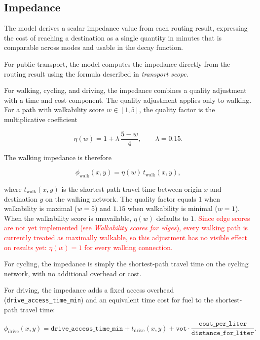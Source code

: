 \documentclass{article}
\newcommand{\notimpl}[1]{\textcolor{red}{#1}}
\begin{document}
\subsection{Impedance}
The model derives a scalar impedance value from each routing result, expressing
the cost of reaching a destination as a single quantity in minutes that is
comparable across modes and usable in the decay function.

For public transport, the model computes the impedance directly from the
routing result using the formula described in \emph{transport scope}.

For walking, cycling, and driving, the impedance combines a quality
adjustment with a time and cost component. The quality adjustment applies
only to walking. For a path with walkability score \(w \in [1,5]\), the
quality factor is the multiplicative coefficient

\begin{equation}
    \eta(w) = 1 + \lambda\,\frac{5-w}{4},
    \qquad \lambda = 0.15.
\end{equation}

\noindent The walking impedance is therefore

\begin{equation}
    \phi_{\text{walk}}(x,y)
    = \eta(w)\,t_{\text{walk}}(x,y),
\end{equation}

\noindent where \(t_{\text{walk}}(x,y)\) is the shortest-path travel time
between origin \(x\) and destination \(y\) on the walking network. The quality
factor equals \(1\) when walkability is maximal (\(w=5\)) and \(1.15\) when
walkability is minimal (\(w=1\)). When the walkability score is unavailable,
\(\eta(w)\) defaults to \(1\). \notimpl{Since edge scores are not yet
implemented (see \emph{Walkability scores for edges}), every walking path is
currently treated as maximally walkable, so this adjustment has no visible
effect on results yet: \(\eta(w) = 1\) for every walking connection.}

For cycling, the impedance is simply the shortest-path travel time on the
cycling network, with no additional overhead or cost.

For driving, the impedance adds a fixed access overhead
(\texttt{drive\_access\_time\_min}) and an equivalent time cost for fuel to
the shortest-path travel time:

\begin{equation}
    \phi_{\text{drive}}(x,y)
    =
    \texttt{drive\_access\_time\_min}
    +
    t_{\text{drive}}(x,y)
    +
    \texttt{vot} \cdot \frac{\texttt{cost\_per\_liter}}{\texttt{distance\_for\_liter}}.
\end{equation}
\end{document}
